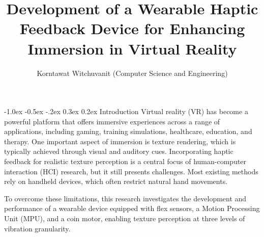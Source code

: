 \documentclass[a4paper,twocolumn]{article}
\title{\textbf{\Large Development of a Wearable Haptic Feedback Device for Enhancing Immersion in Virtual Reality}}
\author{\small{Korntawat Witchuvanit (Computer Science and Engineering)}}
\date{\vspace{-3em}}
\begin{document}
\small
\maketitle

\makeatletter
\renewcommand\section{\@startsection{section}{1}{\z@}%
  {-1.0ex \@plus -0.5ex \@minus -.2ex}%
  {0.3ex \@plus 0.2ex}%
  {\normalfont\normalsize\bfseries}}
\makeatother



\section{Introduction}
Virtual reality (VR) has become a powerful platform that offers immersive experiences across a range of applications, including gaming, training simulations, healthcare, education, and therapy\cite{10.3389/frobt.2016.00074}. 
One important aspect of immersion is texture rendering, which is typically achieved through visual and auditory cues. Incorporating haptic feedback for realistic texture perception is a central focus of human-computer interaction (HCI) research, but it still presents challenges. Most existing methods rely on handheld devices, which often restrict natural hand movements.

To overcome these limitations, this research investigates the development and performance of a wearable device equipped with flex sensors, a Motion Processing Unit (MPU), and a coin motor, enabling texture perception at three levels of vibration granularity.
\end{document}
